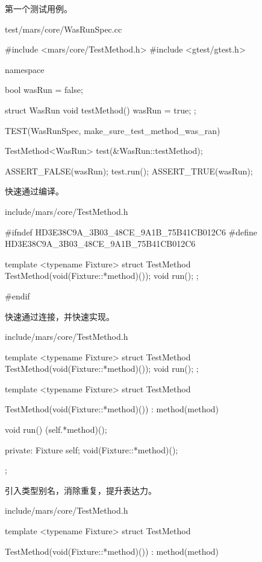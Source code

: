 \begin{content}

第一个测试用例。

\begin{nodiff}{test/mars/core/WasRunSpec.cc}
\begin{c++}
#include <mars/core/TestMethod.h>
#include <gtest/gtest.h>

namespace {
  bool wasRun = false;

  struct WasRun {
    void testMethod() {
      wasRun = true;
    }
  };
}

TEST(WasRunSpec, make_sure_test_method_was_ran) {
  TestMethod<WasRun> test(&WasRun::testMethod);

  ASSERT_FALSE(wasRun);
  test.run();
  ASSERT_TRUE(wasRun);
}
\end{c++}
\end{nodiff}

快速通过编译。

\begin{nodiff}{include/mars/core/TestMethod.h}
\begin{c++}
#ifndef HD3E38C9A_3B03_48CE_9A1B_75B41CB012C6
#define HD3E38C9A_3B03_48CE_9A1B_75B41CB012C6

template <typename Fixture>
struct TestMethod {
  TestMethod(void(Fixture::*method)());
  void run();
};

#endif
\end{c++}
\end{nodiff}

快速通过连接，并快速实现。

\begin{diff}{include/mars/core/TestMethod.h}
\begin{minicpp}
template <typename Fixture>
struct TestMethod {
  TestMethod(void(Fixture::*method)());
  void run();
};
\end{minicpp}
\tcblower
\begin{minicpp}
template <typename Fixture>
struct TestMethod {
  TestMethod(void(Fixture::*method)())
    : method(method) {}

  void run() {
    (self.*method)();
  }

private:
  Fixture self;
  void(Fixture::*method)();
};
\end{minicpp}
\end{diff}

引入类型别名，消除重复，提升表达力。

\begin{diff}{include/mars/core/TestMethod.h}
\begin{minicpp}
template <typename Fixture>
struct TestMethod {
  TestMethod(void(Fixture::*method)())
    : method(method) {}

}
\end{minicpp}
\end{diff}
\end{content}

